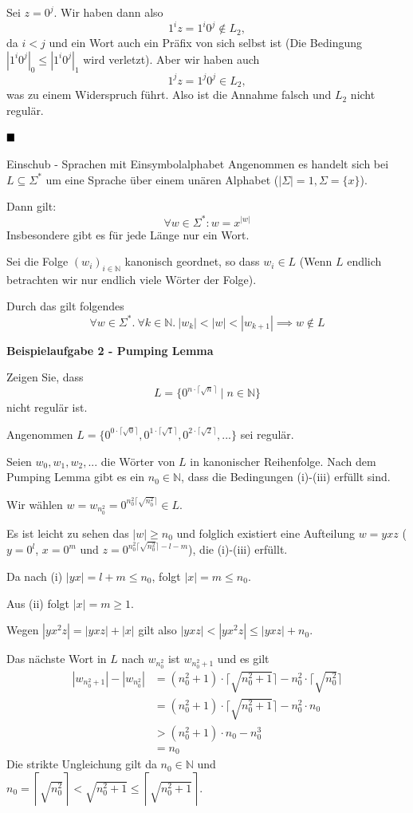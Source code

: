 \documentclass[a4paper, 11pt]{article}
\def\N{\mathbb{N}}
\newcommand\myTitle[1]{{\large \textbf {#1}}}
\begin{document}
    Sei $z = 0^j$. Wir haben dann also 
    $$1^iz = 1^i0^j \notin L_2,$$
    da $i < j$ und ein Wort auch ein Präfix von sich selbst ist (Die Bedingung $|1^i0^j|_0 \leq |1^i0^j|_1$ wird verletzt).
    Aber wir haben auch
    $$1^jz = 1^j0^j \in L_2,$$
    was zu einem Widerspruch führt. Also ist die Annahme falsch und $L_2$ nicht regulär.

    $\hfill\blacksquare$

\begin{subbox}{Einschub - Sprachen mit Einsymbolalphabet}
    Angenommen es handelt sich bei $L \subseteq \Sigma^*$ um eine Sprache über einem unären Alphabet ($|\Sigma| = 1, \Sigma = \{x\}$).

    Dann gilt: $$\forall w \in \Sigma^*: w = x^{|w|}$$
    Insbesondere gibt es für jede Länge nur ein Wort. 
    
    Sei die Folge $(w_i)_{i \in \N}$ kanonisch geordnet, so dass $w_i \in L$ (Wenn $L$ endlich betrachten wir nur endlich viele Wörter der Folge).
    
    Durch das gilt folgendes
    $$\forall w \in \Sigma^*. \ \forall k \in \N. \ |w_k| < |w| < |w_{k+1}| \implies w \notin L$$
\end{subbox}


    \myTitle{Beispielaufgabe 2 - Pumping Lemma}

    Zeigen Sie, dass 
    $$L = \{0^{n\cdot \lceil \sqrt{n}\rceil} \mid n \in \N\}$$ 
    nicht regulär ist.

    Angenommen $L = \{0^{0\cdot \lceil \sqrt{0}\rceil}, 0^{1\cdot \lceil \sqrt{1}\rceil}, 0^{2\cdot \lceil \sqrt{2}\rceil}, ...\}$ sei regulär.

    Seien  $w_0, w_1, w_2, ...$ die Wörter von $L$ in kanonischer Reihenfolge. 
    Nach dem Pumping Lemma gibt es ein $n_0 \in \N$, dass die Bedingungen (i)-(iii) erfüllt sind.

    Wir wählen $w = w_{n_0^2} = 0^{n_0^2\lceil\sqrt{n_0^2}\rceil} \in L$. 
    
    Es ist leicht zu sehen das $|w| \geq n_0$ und folglich existiert eine Aufteilung $w = yxz$ ($y = 0^l$, $x = 0^m$ und $z = 0^{n_0^2\lceil\sqrt{n_0^2}\rceil-l-m}$), die (i)-(iii) erfüllt. 
    
    Da nach (i) $|yx| = l + m \leq n_0$, folgt $|x| = m \leq n_0$.

    Aus (ii) folgt $|x| = m \geq 1$.

    Wegen $|yx^2z| = |yxz| + |x|$ gilt also $|yxz| < |yx^2z| \leq |yxz| + n_0$.

    Das nächste Wort in $L$ nach $w_{n_0^2}$ ist $w_{n_0^2+1}$ und es gilt
    \begin{align*}
        |w_{n_0^2+1}| - |w_{n_0^2}| &= (n_0^2+1)\cdot \lceil\sqrt{n_0^2 + 1}\rceil - n_0^2 \cdot \lceil\sqrt{n_0^2}\rceil\\
        &= (n_0^2+1)\cdot\lceil\sqrt{n_0^2+1}\rceil - n_0^2 \cdot n_0\\
        &> (n_0^2+1)\cdot n_0 - n_0^3\\
        &= n_0
    \end{align*}
    Die strikte Ungleichung gilt da $n_0 \in \N$ und $n_0 = \left\lceil\sqrt{n_0^2}\right\rceil < \sqrt{n_0^2+1} \leq \left\lceil\sqrt{n_0^2+1}\right\rceil$.
\end{document}
